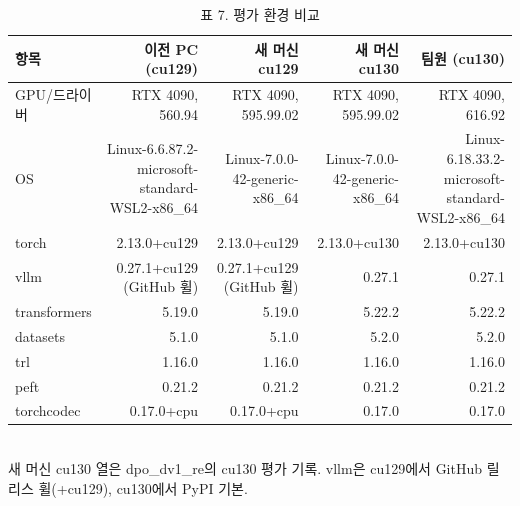 \begin{table}[t]
\centering
\small
\caption{표 7. 평가 환경 비교}
\label{tab:table7_environments}
\begin{tabular}{lrrrr}
\toprule
항목 & 이전 PC (cu129) & 새 머신 cu129 & 새 머신 cu130 & 팀원 (cu130) \\
\midrule
GPU/드라이버 & RTX 4090, 560.94 & RTX 4090, 595.99.02 & RTX 4090, 595.99.02 & RTX 4090, 616.92 \\
OS & Linux-6.6.87.2-microsoft-standard-WSL2-x86\_64 & Linux-7.0.0-42-generic-x86\_64 & Linux-7.0.0-42-generic-x86\_64 & Linux-6.18.33.2-microsoft-standard-WSL2-x86\_64 \\
torch & 2.13.0+cu129 & 2.13.0+cu129 & 2.13.0+cu130 & 2.13.0+cu130 \\
vllm & 0.27.1+cu129 (GitHub 휠) & 0.27.1+cu129 (GitHub 휠) & 0.27.1 & 0.27.1 \\
transformers & 5.19.0 & 5.19.0 & 5.22.2 & 5.22.2 \\
datasets & 5.1.0 & 5.1.0 & 5.2.0 & 5.2.0 \\
trl & 1.16.0 & 1.16.0 & 1.16.0 & 1.16.0 \\
peft & 0.21.2 & 0.21.2 & 0.21.2 & 0.21.2 \\
torchcodec & 0.17.0+cpu & 0.17.0+cpu & 0.17.0 & 0.17.0 \\
\bottomrule
\end{tabular}
\\[2pt]{\footnotesize 새 머신 cu130 열은 dpo\_dv1\_re의 cu130 평가 기록. vllm은 cu129에서 GitHub 릴리스 휠(+cu129), cu130에서 PyPI 기본.}
\end{table}
